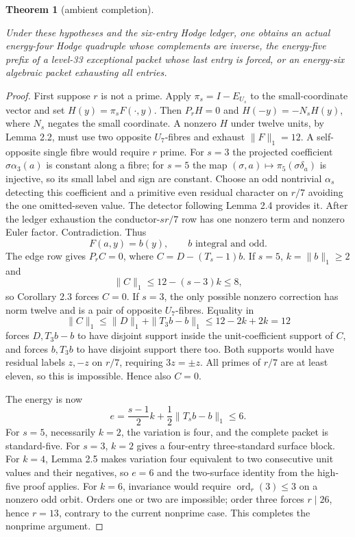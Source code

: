 \documentclass[11pt]{amsart}
\newtheorem{theorem}{Theorem}
\numberwithin{theorem}{section}
\theoremstyle{remark}
\numberwithin{equation}{section}
\begin{document}
\begin{theorem}[ambient completion]\label{theorem:7.5}

Under these hypotheses and the six-entry Hodge ledger, one obtains an
actual energy-four Hodge quadruple whose complements are inverse, the
energy-five prefix of a level-33 exceptional packet whose last entry is
forced, or an energy-six algebraic packet exhausting all entries.

\end{theorem}
\begin{proof}

First suppose \(r\) is not a prime. Apply \(\pi_s=I-E_{U_s}\) to the
small-coordinate vector and set \(H(y)=\pi_sF(\cdot,y)\). Then
\(P_rH=0\) and \(H(-y)=-N_sH(y)\), where \(N_s\) negates the small
coordinate. A nonzero \(H\) under twelve units, by Lemma 2.2, must use
two opposite \(U_7\)-fibres and exhaust \(\|F\|_1=12\). A
self-opposite single fibre would require \(r\) prime. For \(s=3\) the
projected coefficient \(\sigma\alpha_3(a)\) is constant along a fibre;
for \(s=5\) the map \((\sigma,a)\mapsto\pi_5(\sigma\delta_a)\) is
injective, so its small label and sign are constant. Choose an odd
nontrivial \(\alpha_s\) detecting this coefficient and a primitive even
residual character on \(r/7\) avoiding the one omitted-seven value. The
detector following Lemma 2.4 provides it. After the ledger exhaustion
the conductor-\(sr/7\) row has one nonzero term and nonzero Euler factor.
Contradiction. Thus
\[
F(a,y)=b(y),\qquad b\text{ integral and odd}.
\]
The edge row gives \(P_rC=0\), where \(C=D-(T_s-1)b\). If \(s=5\),
\(k=\|b\|_1\ge2\) and
\[
\|C\|_1\le12-(s-3)k\le8,
\]
so Corollary 2.3 forces \(C=0\). If \(s=3\), the only possible
nonzero correction has norm twelve and is a pair of opposite
\(U_7\)-fibres. Equality in
\[
\|C\|_1\le\|D\|_1+\|T_3b-b\|_1\le12-2k+2k=12
\]
forces \(D,T_3b-b\) to have disjoint support inside the unit-coefficient
support of \(C\), and forces \(b,T_3b\) to have disjoint support there
too. Both supports would have residual labels \(z,-z\) on \(r/7\),
requiring \(3z=\pm z\). All primes of \(r/7\) are at least eleven, so
this is impossible. Hence also \(C=0\).

The energy is now
\[
e=\frac{s-1}{2}k+\frac12\|T_sb-b\|_1\le6.
\tag{13}\label{eq:13}
\]
For \(s=5\), necessarily \(k=2\), the variation is four, and the
complete packet is standard-five. For \(s=3\), \(k=2\) gives a
four-entry three-standard surface block. For \(k=4\), Lemma 2.5 makes
variation four equivalent to two consecutive unit values and their
negatives, so \(e=6\) and the two-surface identity from the high-five
proof applies. For \(k=6\), invariance would require
\(\operatorname{ord}_r(3)\le3\) on a nonzero odd orbit. Orders one or
two are impossible; order three forces \(r\mid26\), hence \(r=13\),
contrary to the current nonprime case. This completes the nonprime
argument.


\end{proof}
\end{document}
